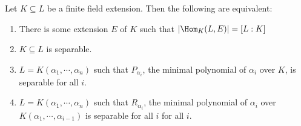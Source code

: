 \documentclass[a4paper]{article}
\begin{document}
\begin{thm}
  Let $K\subseteq L$ be a finite field extension. Then the following are equivalent:
  \begin{enumerate}
    \item There is some extension $E$ of $K$ such that $|\Hom_K(L, E)| = [L:K]$
    \item $K\subseteq L$ is separable.
    \item $L = K(\alpha_1, \cdots, \alpha_n)$ such that $P_{\alpha_i}$, the minimal polynomial of $\alpha_i$ over $K$, is separable for all $i$.
    \item $L = K(\alpha_1, \cdots, \alpha_n)$ such that $R_{\alpha_i}$, the minimal polynomial of $\alpha_i$ over $K(\alpha_1, \cdots, \alpha_{i - 1})$ is separable for all $i$ for all $i$.
  \end{enumerate}
\end{thm}
\end{document}
